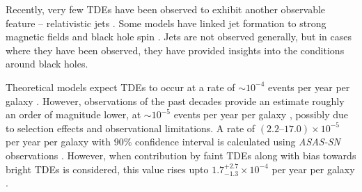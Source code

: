 \documentclass{tda}
\begin{document}
Recently, very few TDEs have been observed to exhibit another observable feature -- relativistic jets \cite{lodato_recent_2015}. Some models have linked jet formation to strong magnetic fields and black hole spin \cite{dai_unified_2018}. Jets are not observed generally, but in cases where they have been observed, they have provided insights into the conditions around black holes.

Theoretical models expect TDEs to occur at a rate of \(\sim 10^{-4}\) events per year per galaxy \cite{magorrian_rates_1999}. However, observations of the past decades provide an estimate roughly an order of magnitude lower, at \(\sim 10^{-5}\) events per year per galaxy \cite{stone_rates_2016}, possibly due to selection effects and observational limitations. A rate of \((2.2–17.0) \times 10^{−5}\) per year per galaxy with \(90\%\) confidence interval is calculated using \textit{ASAS-SN} observations \cite{holoien_six_2016}. However, when contribution by faint TDEs along with bias towards bright TDEs is considered, this value rises upto \(1.7_{-1.3}^{+2.7} \times 10^{-4}\) per year per galaxy \cite{hung_sifting_2018}. 
\end{document}
